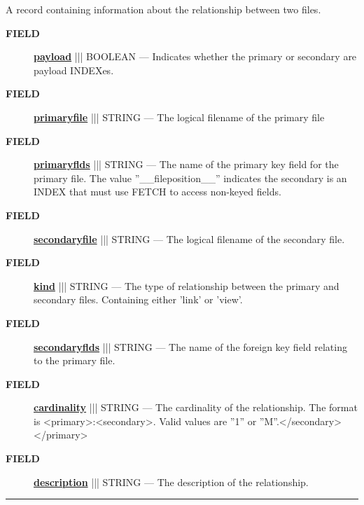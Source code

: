 \par





A record containing information about the relationship between two files.







\par
\begin{description}
\item [\colorbox{tagtype}{\color{white} \textbf{\textsf{FIELD}}}] \textbf{\underline{payload}} ||| BOOLEAN --- Indicates whether the primary or secondary are payload INDEXes.
\item [\colorbox{tagtype}{\color{white} \textbf{\textsf{FIELD}}}] \textbf{\underline{primaryfile}} ||| STRING --- The logical filename of the primary file
\item [\colorbox{tagtype}{\color{white} \textbf{\textsf{FIELD}}}] \textbf{\underline{primaryflds}} ||| STRING --- The name of the primary key field for the primary file. The value ''\_\_fileposition\_\_'' indicates the secondary is an INDEX that must use FETCH to access non-keyed fields.
\item [\colorbox{tagtype}{\color{white} \textbf{\textsf{FIELD}}}] \textbf{\underline{secondaryfile}} ||| STRING --- The logical filename of the secondary file.
\item [\colorbox{tagtype}{\color{white} \textbf{\textsf{FIELD}}}] \textbf{\underline{kind}} ||| STRING --- The type of relationship between the primary and secondary files. Containing either 'link' or 'view'.
\item [\colorbox{tagtype}{\color{white} \textbf{\textsf{FIELD}}}] \textbf{\underline{secondaryflds}} ||| STRING --- The name of the foreign key field relating to the primary file.
\item [\colorbox{tagtype}{\color{white} \textbf{\textsf{FIELD}}}] \textbf{\underline{cardinality}} ||| STRING --- The cardinality of the relationship. The format is <primary>:<secondary>. Valid values are ''1'' or ''M''.</secondary></primary>
\item [\colorbox{tagtype}{\color{white} \textbf{\textsf{FIELD}}}] \textbf{\underline{description}} ||| STRING --- The description of the relationship.
\end{description}





\rule{\linewidth}{0.5pt}
